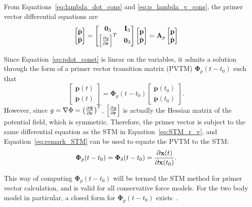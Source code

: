 From Equations~\eqref{eq:lambda_dot_cons} and \eqref{eq:p_lambda_v_cons}, the primer vector differential equations are
\begin{equation}\label{eq:pdot_const}
    \begin{bmatrix}
        \dot{\mathbf{p}} \\ \ddot{\mathbf{p}}
    \end{bmatrix} = \begin{bmatrix}
        \mathbf{0}_3 & \mathbf{I}_3 \\
        \left[\frac{\partial g}{\partial \pos}\right]^T & \mathbf{0}_3
    \end{bmatrix} \begin{bmatrix}
        \mathbf{p} \\ \dot{\mathbf{p}}
    \end{bmatrix} = \mathbf{A}_p \begin{bmatrix}
        \mathbf{p} \\ \dot{\mathbf{p}}
    \end{bmatrix}
\end{equation}

Since Equation~\eqref{eq:pdot_const} is linear on the variables, it admits a solution through the form of a primer vector transition matrix (PVTM) \(\mathbf{\Phi}_p(t - t_0)\) such that
\begin{equation}
    \begin{bmatrix}
        \mathbf{p}(t) \\ \dot{\mathbf{p}}(t)
    \end{bmatrix} = \mathbf{\Phi}_p(t - t_0) \begin{bmatrix}
        \mathbf{p}(t_0) \\ \dot{\mathbf{p}}(t_0)
    \end{bmatrix}.
\end{equation}
However, since \(g = \nabla \Phi = \left(\frac{\partial \Phi}{\partial \mathbf{r}}\right)^T\), \(\left[\frac{\partial g}{\partial \mathbf{r}}\right]\) is actually the Hessian matrix of the potential field, which is symmetric. Therefore, the primer vector is subject to the same differential equation as the STM in Equation~\eqref{eq:STM_r_v}, and Equation~\eqref{eq:remark_STM} can be used to equate the PVTM to the STM:
\begin{equation}
    \mathbf{\Phi}_p(t - t_0) = \mathbf{\Phi}_\delta(t - t_0) = \frac{\partial \mathbf{x}(t)}{\partial \mathbf{x}(t_0)}.
\end{equation}

This way of computing \(\mathbf{\Phi}_p(t - t_0)\) will be termed the STM method for primer vector calculation, and is valid for all conservative force models. For the two body model in particular, a closed form for \(\mathbf{\Phi}_p(t-t_0)\) exists~\cite{glandorf_transition_matrix}. 

